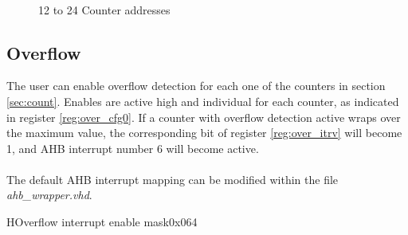 \begin{figure}[H]
	\begin{center}
		 \\
		 \\
		 \\
		 \\
		 \\
		 \\
		 \\
		 \\
		 \\
		 \\
		 \\
	\end{center}
	\caption{12 to 24 Counter addresses}\label{fig:counters1}
\end{figure}

\subsection{Overflow}
\label{sec:over}
The user can enable overflow detection for each one of the counters in section \ref{sec:count}. Enables are active high and individual for each counter, as indicated in register \ref{reg:over_cfg0}. If a counter with overflow detection active wraps over the maximum value, the corresponding bit of register \ref{reg:over_itrv} will become 1, and  AHB interrupt number 6 will become active.\\
\\
The default AHB interrupt mapping can be modified within the file \textit{ahb\_wrapper.vhd}.
\begin{register}{H}{Overflow interrupt enable mask}{0x064}
	\begin{tiny}
		\label{reg:over_cfg0}
		\regnewline
	\end{tiny}
\end{register}

